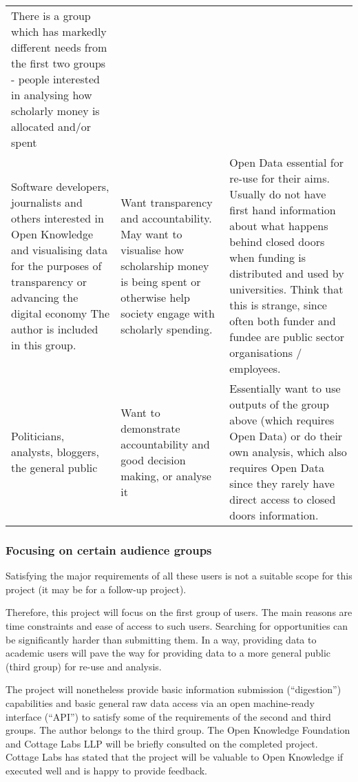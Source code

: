 \begin{table}
\begin{tabulary}{\linewidth}{LLL}
There is a group which has markedly different needs from the first two groups - people interested in analysing how scholarly money is allocated and/or spent \\
Software developers, journalists and others interested in Open Knowledge and visualising data for the purposes of transparency or advancing the digital economy \cite{okfn-vision} The author is included in this group. & Want transparency and accountability. May want to visualise how scholarship money is being spent or otherwise help society engage with scholarly spending. & Open Data essential for re-use for their aims. Usually do not have first hand information about what happens behind closed doors when funding is distributed and used by universities. Think that this is strange, since often both funder and fundee are public sector organisations / employees. \\
Politicians, analysts, bloggers, the general public & Want to demonstrate accountability and good decision making, or analyse it & Essentially want to use outputs of the group above (which requires Open Data) or do their own analysis, which also requires Open Data since they rarely have direct access to closed doors information. \\
\end{tabulary}
\label{tab:case-repr}
\end{table}
\egroup

\subsubsection{Focusing on certain audience groups}
\label{focus-groups}
Satisfying the major requirements of all these users is not a suitable scope for this project (it may be for a follow-up project).

Therefore, this project will focus on the first group of users. The main reasons are time constraints and ease of access to such users. Searching for opportunities can be significantly harder than submitting them. In a way, providing data to academic users will pave the way for providing data to a more general public (third group) for re-use and analysis.

The project will nonetheless provide basic information submission (``digestion'') capabilities and basic general raw data access via an open machine-ready interface (``API'') to satisfy some of the requirements of the second and third groups. The author belongs to the third group. The Open Knowledge Foundation \cite{okfn-vision} and Cottage Labs LLP \cite{cl} will be briefly consulted on the completed project. Cottage Labs has stated that the project will be valuable to Open Knowledge if executed well and is happy to provide feedback.

